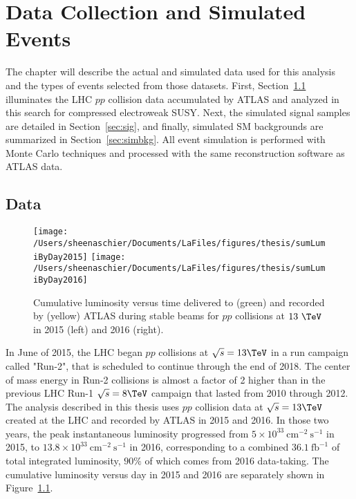 \chapter{Data Collection and Simulated Events}
\label{ch:data}
The chapter will describe the actual and simulated data used for this analysis and the types of events selected from those datasets.  First, Section~\ref{sec:data} illuminates the LHC $pp$ collision data accumulated by ATLAS and analyzed in this search for compressed electroweak SUSY.  Next, the simulated signal samples are detailed in Section~\ref{sec:sig}, and finally, simulated SM backgrounds are summarized in Section~\ref{sec:simbkg}.  All event simulation is performed with Monte Carlo techniques and processed with the same reconstruction software as ATLAS data.  
 
\section{Data}
\label{sec:data}

 \begin{figure}[tbp]
 \texttt{[image: /Users/sheenaschier/Documents/LaFiles/figures/thesis/sumLumiByDay2015]}
 \texttt{[image: /Users/sheenaschier/Documents/LaFiles/figures/thesis/sumLumiByDay2016]}\\
 \caption{Cumulative luminosity versus time delivered to (green) and recorded by (yellow) ATLAS during stable beams for $pp$ collisions at $13~\TeV$ in 2015 (left) and 2016 (right).}
 \label{fig:lumi}
 \end{figure}
In June of 2015, the LHC began $pp$ collisions at $\sqrt{s}=13\TeV$ in a run campaign called "Run-2", that is scheduled to continue through the end of 2018.  The center of mass energy in Run-2 collisions is almost a factor of 2 higher than in the previous LHC Run-1 $\sqrt{s}=8\TeV$ campaign that lasted from 2010 through 2012. The analysis described in this thesis uses $pp$ collision data at $\sqrt{s}=13\TeV$ created at the LHC and recorded by ATLAS in 2015 and 2016.  In those two years, the peak instantaneous luminosity progressed from $5\times10^{33}~\mathrm{cm}^{-2}~\mathrm{s}^{-1}$ in 2015, to $13.8\times10^{33}~\mathrm{cm}^{-2}~\mathrm{s}^{-1}$ in 2016, corresponding to a combined $36.1~\mathrm{fb}^{-1}$ of total integrated luminosity, $90\%$ of which comes from 2016 data-taking.  The cumulative luminosity versus day in 2015 and 2016 are separately shown in Figure~\ref{fig:lumi}.


